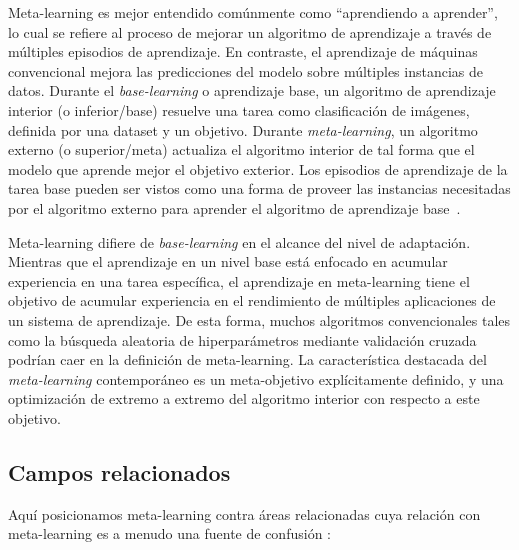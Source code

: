 Meta-learning es mejor entendido comúnmente como ``aprendiendo a aprender'', lo cual se refiere al proceso de mejorar un algoritmo de aprendizaje a través de múltiples episodios de aprendizaje. En contraste, el aprendizaje de máquinas convencional mejora las predicciones del modelo sobre múltiples instancias de datos. Durante el \textit{base-learning} o aprendizaje base, un algoritmo de aprendizaje interior (o inferior/base) resuelve una tarea como clasificación de imágenes, definida por una dataset y un objetivo. Durante \emph{meta-learning}, un algoritmo externo (o superior/meta) actualiza el algoritmo interior de tal forma que el modelo que aprende mejor el objetivo exterior. Los episodios de aprendizaje de la tarea base pueden ser vistos como una forma de proveer las instancias necesitadas por el algoritmo externo para aprender el algoritmo de aprendizaje base~\cite{hospedales2021metalearning}. 

Meta-learning difiere de \textit{base-learning} en el alcance del nivel de adaptación. Mientras que el aprendizaje en un nivel base está enfocado en acumular experiencia en una tarea específica, el aprendizaje en meta-learning tiene el objetivo de acumular experiencia en el rendimiento de múltiples aplicaciones de un sistema de aprendizaje. De esta forma, muchos algoritmos convencionales tales como la búsqueda aleatoria de hiperparámetros mediante validación cruzada podrían caer en la definición de meta-learning. La característica destacada del \emph{meta-learning} contemporáneo es un meta-objetivo explícitamente definido, y una optimización de extremo a extremo del algoritmo interior con respecto a este objetivo.

\subsection{Campos relacionados}\label{subsec:mtl_related_fields}


Aquí posicionamos meta-learning contra áreas relacionadas cuya relación con meta-learning es a menudo una fuente de confusión \cite{hospedales2021metalearning}:

